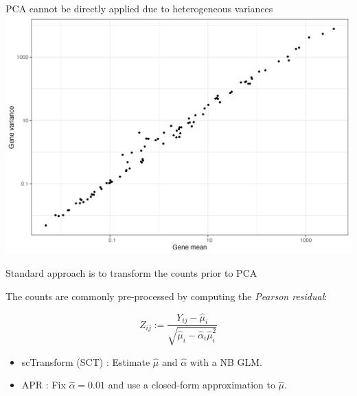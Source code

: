 \documentclass[aspectratio=43]{beamer}
\begin{document}
\begin{frame}{PCA cannot be directly applied due to heterogeneous variances}
\centering 
\includegraphics[scale=0.4]{Fig/mean_variance_relationship.png}
\end{frame}

\begin{frame}{Standard approach is to transform the counts prior to PCA}

The counts are commonly pre-processed by computing the \textit{Pearson residual}:

\begin{equation}
Z_{ij} := \frac{Y_{ij} - \hat{\mu}_{i}}{\sqrt{ \hat{\mu}_{i} - \hat{\alpha}_i \hat{\mu}_{i}^2}}
\end{equation}

\begin{itemize}
\item scTransform (SCT) \cite{hafemeister2019normalization}: Estimate $\hat{\mu}$ and $\hat{\alpha}$ with a NB GLM.
\item APR \cite{lause2021analytic}: Fix $\hat{\alpha} = 0.01$ and use a closed-form approximation to $\hat{\mu}$. 
\end{itemize}
\end{frame}
\end{document}
